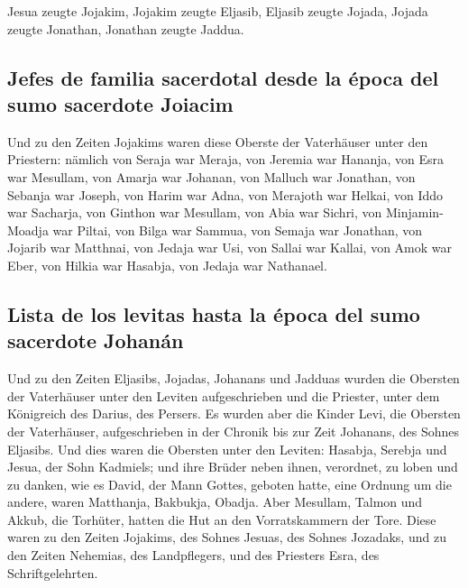  Jesua zeugte Jojakim, Jojakim zeugte Eljasib, Eljasib
zeugte Jojada,  Jojada zeugte Jonathan, Jonathan zeugte
Jaddua.

\hypertarget{jefes-de-familia-sacerdotal-desde-la-uxe9poca-del-sumo-sacerdote-joiacim}{%
\subsection{Jefes de familia sacerdotal desde la época del sumo
sacerdote
Joiacim}\label{jefes-de-familia-sacerdotal-desde-la-uxe9poca-del-sumo-sacerdote-joiacim}}

 Und zu den Zeiten Jojakims waren diese Oberste der
Vaterhäuser unter den Priestern: nämlich von Seraja war Meraja, von
Jeremia war Hananja,  von Esra war Mesullam, von Amarja
war Johanan,  von Malluch war Jonathan, von Sebanja war
Joseph,  von Harim war Adna, von Merajoth war Helkai,
 von Iddo war Sacharja, von Ginthon war Mesullam,
 von Abia war Sichri, von Minjamin-Moadja war Piltai,
 von Bilga war Sammua, von Semaja war Jonathan,
 von Jojarib war Matthnai, von Jedaja war Usi,
 von Sallai war Kallai, von Amok war Eber,
 von Hilkia war Hasabja, von Jedaja war Nathanael.

\hypertarget{lista-de-los-levitas-hasta-la-uxe9poca-del-sumo-sacerdote-johanuxe1n}{%
\subsection{Lista de los levitas hasta la época del sumo sacerdote
Johanán}\label{lista-de-los-levitas-hasta-la-uxe9poca-del-sumo-sacerdote-johanuxe1n}}

 Und zu den Zeiten Eljasibs, Jojadas, Johanans und
Jadduas wurden die Obersten der Vaterhäuser unter den Leviten
aufgeschrieben und die Priester, unter dem Königreich des Darius, des
Persers.  Es wurden aber die Kinder Levi, die Obersten
der Vaterhäuser, aufgeschrieben in der Chronik bis zur Zeit Johanans,
des Sohnes Eljasibs.  Und dies waren die Obersten unter
den Leviten: Hasabja, Serebja und Jesua, der Sohn Kadmiels; und ihre
Brüder neben ihnen, verordnet, zu loben und zu danken, wie es David, der
Mann Gottes, geboten hatte, eine Ordnung um die andere, 
waren Matthanja, Bakbukja, Obadja. Aber Mesullam, Talmon und Akkub, die
Torhüter, hatten die Hut an den Vorratskammern der Tore. 
Diese waren zu den Zeiten Jojakims, des Sohnes Jesuas, des Sohnes
Jozadaks, und zu den Zeiten Nehemias, des Landpflegers, und des
Priesters Esra, des Schriftgelehrten.


